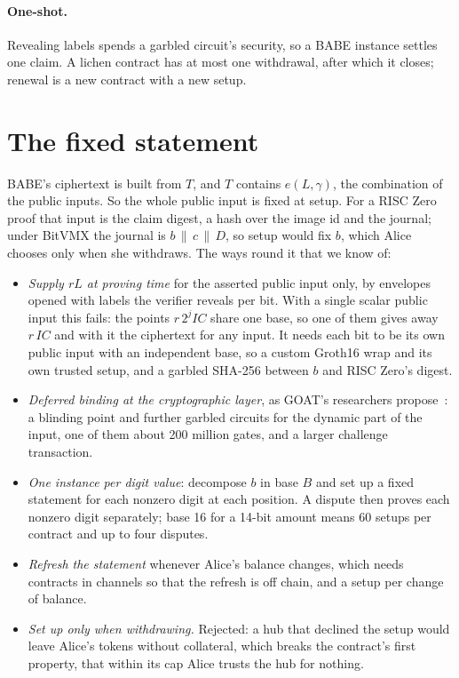 \documentclass[11pt]{article}
\begin{document}
\paragraph{One-shot.} Revealing labels spends a garbled circuit's
security, so a BABE instance settles one claim. A lichen contract has at
most one withdrawal, after which it closes; renewal is a new contract
with a new setup.

\section{The fixed statement}
\label{sec:fixed}

BABE's ciphertext is built from $T$, and $T$ contains $e(L, \gamma)$,
the combination of the public inputs. So the whole public input is fixed
at setup. For a RISC Zero proof that input is the claim digest, a hash
over the image id and the journal; under BitVMX the journal is
$b \,\|\, c \,\|\, D$, so setup would fix $b$, which Alice chooses only
when she withdraws. The ways round it that we know of:
\begin{itemize}[leftmargin=1.5em]
\item \emph{Supply $rL$ at proving time} for the asserted public input
  only, by envelopes opened with labels the verifier reveals per bit.
  With a single scalar public input this fails: the points
  $r\,2^j\mathit{IC}$ share one base, so one of them gives away
  $r\,\mathit{IC}$ and with it the ciphertext for any input. It needs
  each bit to be its own public input with an independent base, so a
  custom Groth16 wrap and its own trusted setup, and a garbled SHA-256
  between $b$ and RISC Zero's digest.
\item \emph{Deferred binding at the cryptographic layer}, as GOAT's
  researchers propose~\cite{goat}: a blinding point and further garbled
  circuits for the dynamic part of the input, one of them about 200
  million gates, and a larger challenge transaction.
\item \emph{One instance per digit value}: decompose $b$ in base $B$ and
  set up a fixed statement for each nonzero digit at each position. A
  dispute then proves each nonzero digit separately; base 16 for a
  14-bit amount means 60 setups per contract and up to four disputes.
\item \emph{Refresh the statement} whenever Alice's balance changes,
  which needs contracts in channels so that the refresh is off chain,
  and a setup per change of balance.
\item \emph{Set up only when withdrawing.} Rejected: a hub that declined
  the setup would leave Alice's tokens without collateral, which breaks
  the contract's first property, that within its cap Alice trusts the
  hub for nothing.
\end{itemize}
\end{document}
